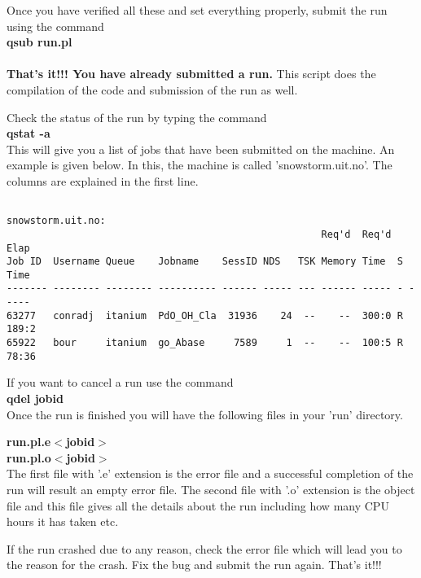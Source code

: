 Once you have verified all these and set everything properly, submit
the run using the command \\

\textbf{qsub run.pl}\\
\\

\textbf{That's it!!!  You have already submitted a run.}  This script
does the compilation of the code and submission of the run as well.    

Check the status of the run by typing the command\\

\textbf{qstat -a}\\

This will give you a list of jobs that have been submitted on the
machine. An example is given below.  In this, the machine is called
'snowstorm.uit.no'.  The columns are explained in the first line.   

\begin{verbatim}

snowstorm.uit.no:
                                                      Req'd  Req'd   Elap
Job ID  Username Queue    Jobname    SessID NDS   TSK Memory Time  S Time
------- -------- -------- ---------- ------ ----- --- ------ ----- - -----
63277   conradj  itanium  PdO_OH_Cla  31936    24  --    --  300:0 R 189:2
65922   bour     itanium  go_Abase     7589     1  --    --  100:5 R 78:36

\end{verbatim}


If you want to cancel a run use the command \\

\textbf{qdel jobid}\\



Once the run is finished you will have the following files in your
'run' directory. 

\textbf{run.pl.e$<$jobid$>$}\\
\textbf{run.pl.o$<$jobid$>$}\\

The first file with '.e' extension is the error file and a successful
completion of the run will result an empty error file.  The second
file with '.o' extension is the object file and this file gives all the
details about the run including how many CPU hours it has taken etc.  

If the run crashed due to any reason, check the error file which will
lead you to the reason for the crash.  Fix the bug and submit the run
again.  That's it!!!  


